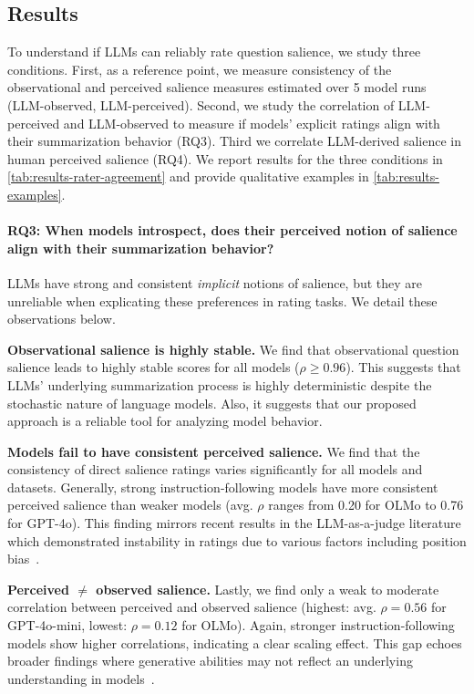 

\subsection{Results}
\label{sec:results-introspection}
To understand if LLMs can reliably rate question salience, we study three conditions.
First, as a reference point, we measure consistency of the observational and perceived salience measures estimated over 5 model runs (LLM-observed, LLM-perceived).
Second, we study the correlation of LLM-perceived and LLM-observed to measure if models' explicit ratings align with their summarization behavior (RQ3).
Third we correlate LLM-derived salience in human perceived salience (RQ4).
We report results for the three conditions in \cref{tab:results-rater-agreement} and provide qualitative examples in \cref{tab:results-examples}.



\paragraph{RQ3: When models introspect, does their perceived notion of salience align with their summarization behavior?}
LLMs have strong and consistent \emph{implicit} notions of salience, but
they are unreliable when explicating these preferences in rating tasks. We detail these observations below.

\textbf{Observational salience is highly stable.}
We find that observational question salience leads to highly stable scores for all models ($\rho \ge 0.96$).
This suggests that LLMs' underlying summarization process is highly deterministic despite the stochastic nature of language models.
Also, it suggests that our proposed approach is a reliable tool for analyzing model behavior.

\textbf{Models fail to have consistent perceived salience.}
We find that the consistency of direct salience ratings varies significantly for all models and datasets.
Generally, strong instruction-following models have more consistent perceived salience than weaker models (avg. $\rho$ ranges from 0.20 for OLMo to 0.76 for GPT-4o).
This finding mirrors recent results in the LLM-as-a-judge literature which demonstrated instability in ratings due to various factors including position bias~\cite{Wang:2024:ACL,Stureborg:2024:arXiv}.

\textbf{Perceived $\neq$ observed salience.}
Lastly, we find only a weak to moderate correlation between perceived and observed salience (highest: avg. $\rho = 0.56$ for GPT-4o-mini, lowest: $\rho = 0.12$ for OLMo).
Again, stronger instruction-following models show higher correlations, indicating a clear scaling effect.
This gap echoes broader findings where generative abilities may not reflect an underlying understanding in models~\cite{West:2024:ICLR}.

